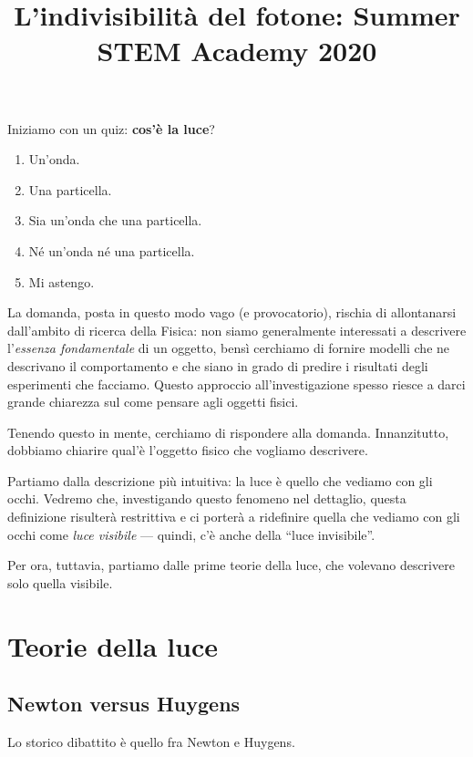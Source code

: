 \documentclass{article}
\title{L'indivisibilità del fotone: Summer STEM Academy 2020}
\begin{document}
\maketitle

Iniziamo con un quiz: \textbf{cos'è la luce}?

\begin{enumerate}[label=\emph{\alph*})]
    \item Un'onda.
    \item Una particella.
    \item Sia un'onda che una particella. 
    \item Né un'onda né una particella. 
    \item Mi astengo.
\end{enumerate}

La domanda, posta in questo modo vago (e provocatorio), rischia di allontanarsi dall'ambito di ricerca della Fisica: non siamo generalmente interessati a descrivere l'\emph{essenza fondamentale} di un oggetto, bensì cerchiamo di fornire modelli che ne descrivano il comportamento e che siano in grado di predire i risultati degli esperimenti che facciamo. 
Questo approccio all'investigazione spesso riesce a darci grande chiarezza sul come pensare agli oggetti fisici. 


Tenendo questo in mente, cerchiamo di rispondere alla domanda.
Innanzitutto, dobbiamo chiarire qual'è l'oggetto fisico che vogliamo descrivere.

Partiamo dalla descrizione più intuitiva: la luce è quello che vediamo con gli occhi. 
Vedremo che, investigando questo fenomeno nel dettaglio, questa definizione risulterà restrittiva e ci porterà a ridefinire quella che vediamo con gli occhi come \emph{luce visibile} --- quindi, c'è anche della ``luce invisibile''.

Per ora, tuttavia, partiamo dalle prime teorie della luce, che volevano descrivere solo quella visibile.

\section{Teorie della luce}

\subsection{Newton versus Huygens} \label{sec:newton-vs-huygens}

Lo storico dibattito è quello fra Newton e Huygens. 
\end{document}
